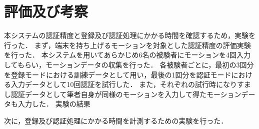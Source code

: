 \section{評価及び考察}
本システムの認証精度と登録及び認証処理にかかる時間を確認するため，実験を行った．
まず，端末を持ち上げるモーションを対象とした認証精度の評価実験を行った．
本システムを用いてあらかじめ6名の被験者にモーションを4回入力してもらい，モーションデータの収集を行った．
各被験者ごとに，最初の3回分を登録モードにおける訓練データとして用い，最後の1回分を認証モードにおける入力データとして10回認証を試行した．
また，それぞれの試行時になりすまし認証データとして筆者自身が同様のモーションを入力して得たモーションデータも入力した．
実験の結果

次に，登録及び認証処理にかかる時間を計測するための実験を行った．
